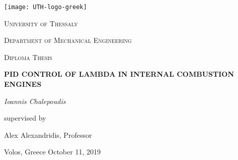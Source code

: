 \begin{titlepage}
	\centering
	\texttt{[image: UTH-logo-greek]}\par\vspace{1cm}
	{\scshape\LARGE University of Thessaly \par}
	{\scshape\Large Department of Mechanical Engineering\par}
	\vspace{1cm}
	{\scshape\Large Diploma Thesis\par}
	\vspace{1.5cm}
    {\huge\bfseries PID CONTROL OF LAMBDA IN
INTERNAL COMBUSTION ENGINES \par}
	\vspace{2cm}
	{\Large\itshape Ioannis Chalepoudis\par}
	\vfill
	supervised by\par
	Alex Alexandridis, Professor\\ 
	\vfill

	{\large Volos, Greece October 11, 2019\par}
\end{titlepage}
